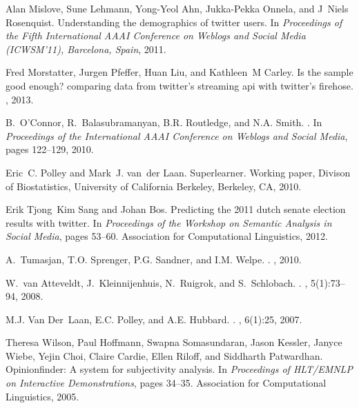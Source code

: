\documentclass{sig-alternate-2013}
\begin{document}
\begin{thebibliography}{10}
Alan Mislove, Sune Lehmann, Yong-Yeol Ahn, Jukka-Pekka Onnela, and J~Niels
  Rosenquist.
\newblock Understanding the demographics of twitter users.
\newblock In {\em Proceedings of the Fifth International AAAI Conference on
  Weblogs and Social Media (ICWSM’11), Barcelona, Spain}, 2011.

Fred Morstatter, Jurgen Pfeffer, Huan Liu, and Kathleen~M Carley.
\newblock Is the sample good enough? comparing data from twitter’s streaming
  api with twitter’s firehose.
, 2013.

B.~O'Connor, R.~Balasubramanyan, B.R. Routledge, and N.A. Smith.
.
\newblock In {\em Proceedings of the International AAAI Conference on Weblogs
  and Social Media}, pages 122--129, 2010.

\vfill\eject
{}
Eric~C. Polley and Mark~J. van~der Laan.
\newblock Superlearner.
\newblock Working paper, Divison of Biostatistics, University of California
  Berkeley, Berkeley, CA, 2010.

Erik Tjong~Kim Sang and Johan Bos.
\newblock Predicting the 2011 dutch senate election results with twitter.
\newblock In {\em Proceedings of the Workshop on Semantic Analysis in Social
  Media}, pages 53--60. Association for Computational Linguistics, 2012.


A.~Tumasjan, T.O. Sprenger, P.G. Sandner, and I.M. Welpe.
.
, 2010.

W.~van Atteveldt, J.~Kleinnijenhuis, N.~Ruigrok, and S.~Schlobach.
.
, 5(1):73--94,
  2008.

M.J. Van Der~Laan, E.C. Polley, and A.E. Hubbard.
.
,
  6(1):25, 2007.

Theresa Wilson, Paul Hoffmann, Swapna Somasundaran, Jason Kessler, Janyce
  Wiebe, Yejin Choi, Claire Cardie, Ellen Riloff, and Siddharth Patwardhan.
\newblock Opinionfinder: A system for subjectivity analysis.
\newblock In {\em Proceedings of HLT/EMNLP on Interactive Demonstrations},
  pages 34--35. Association for Computational Linguistics, 2005.

\end{thebibliography}
\end{document}
